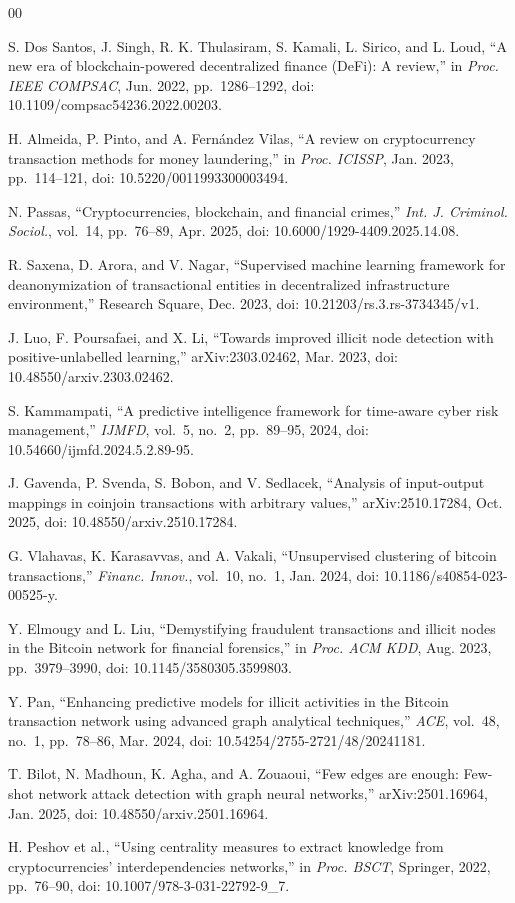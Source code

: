 \documentclass[conference]{IEEEtran}
\begin{document}
\begin{thebibliography}{00}

S. Dos Santos, J. Singh, R. K. Thulasiram, S. Kamali, L. Sirico,
and L. Loud, ``A new era of blockchain-powered decentralized
finance (DeFi): A review,'' in \textit{Proc. IEEE COMPSAC},
Jun. 2022, pp.~1286--1292, doi: 10.1109/compsac54236.2022.00203.

H. Almeida, P. Pinto, and A. Fern\'{a}ndez Vilas, ``A review on
cryptocurrency transaction methods for money laundering,'' in
\textit{Proc. ICISSP}, Jan. 2023, pp.~114--121,
doi: 10.5220/0011993300003494.

N. Passas, ``Cryptocurrencies, blockchain, and financial crimes,''
\textit{Int. J. Criminol. Sociol.}, vol.~14, pp.~76--89,
Apr. 2025, doi: 10.6000/1929-4409.2025.14.08.

R. Saxena, D. Arora, and V. Nagar, ``Supervised machine learning
framework for deanonymization of transactional entities in
decentralized infrastructure environment,'' Research Square,
Dec. 2023, doi: 10.21203/rs.3.rs-3734345/v1.

J. Luo, F. Poursafaei, and X. Li, ``Towards improved illicit node
detection with positive-unlabelled learning,''
arXiv:2303.02462, Mar. 2023, doi: 10.48550/arxiv.2303.02462.

S. Kammampati, ``A predictive intelligence framework for
time-aware cyber risk management,'' \textit{IJMFD}, vol.~5,
no.~2, pp.~89--95, 2024, doi: 10.54660/ijmfd.2024.5.2.89-95.

J. Gavenda, P. Svenda, S. Bobon, and V. Sedlacek, ``Analysis of
input-output mappings in coinjoin transactions with arbitrary
values,'' arXiv:2510.17284, Oct. 2025,
doi: 10.48550/arxiv.2510.17284.

G. Vlahavas, K. Karasavvas, and A. Vakali, ``Unsupervised
clustering of bitcoin transactions,'' \textit{Financ. Innov.},
vol.~10, no.~1, Jan. 2024,
doi: 10.1186/s40854-023-00525-y.

Y. Elmougy and L. Liu, ``Demystifying fraudulent transactions
and illicit nodes in the Bitcoin network for financial
forensics,'' in \textit{Proc. ACM KDD}, Aug. 2023,
pp.~3979--3990, doi: 10.1145/3580305.3599803.

Y. Pan, ``Enhancing predictive models for illicit activities
in the Bitcoin transaction network using advanced graph
analytical techniques,'' \textit{ACE}, vol.~48, no.~1,
pp.~78--86, Mar. 2024, doi: 10.54254/2755-2721/48/20241181.

T. Bilot, N. Madhoun, K. Agha, and A. Zouaoui, ``Few edges
are enough: Few-shot network attack detection with graph
neural networks,'' arXiv:2501.16964, Jan. 2025,
doi: 10.48550/arxiv.2501.16964.

H. Peshov et al., ``Using centrality measures to extract
knowledge from cryptocurrencies' interdependencies networks,''
in \textit{Proc. BSCT}, Springer, 2022, pp.~76--90,
doi: 10.1007/978-3-031-22792-9\_7.

\end{thebibliography}
\end{document}
